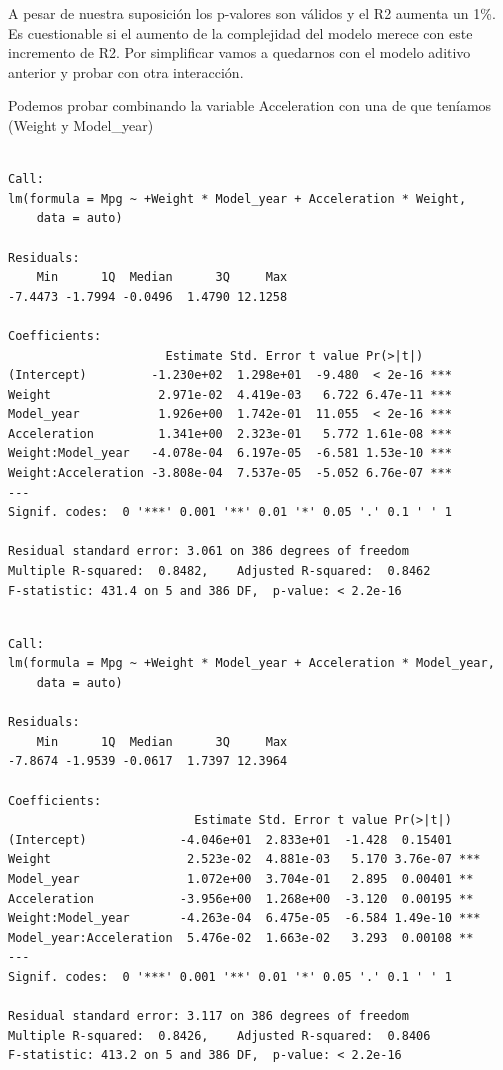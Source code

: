 A pesar de nuestra suposición los p-valores son válidos y el R2 aumenta un 1\%. Es cuestionable si el aumento de la complejidad del modelo merece con este incremento de R2. Por simplificar vamos a quedarnos con el modelo aditivo anterior y probar con otra interacción.

Podemos probar combinando la variable Acceleration con una de que teníamos (Weight y Model\_year)

\begin{verbatim}

Call:
lm(formula = Mpg ~ +Weight * Model_year + Acceleration * Weight, 
    data = auto)

Residuals:
    Min      1Q  Median      3Q     Max 
-7.4473 -1.7994 -0.0496  1.4790 12.1258 

Coefficients:
                      Estimate Std. Error t value Pr(>|t|)    
(Intercept)         -1.230e+02  1.298e+01  -9.480  < 2e-16 ***
Weight               2.971e-02  4.419e-03   6.722 6.47e-11 ***
Model_year           1.926e+00  1.742e-01  11.055  < 2e-16 ***
Acceleration         1.341e+00  2.323e-01   5.772 1.61e-08 ***
Weight:Model_year   -4.078e-04  6.197e-05  -6.581 1.53e-10 ***
Weight:Acceleration -3.808e-04  7.537e-05  -5.052 6.76e-07 ***
---
Signif. codes:  0 '***' 0.001 '**' 0.01 '*' 0.05 '.' 0.1 ' ' 1

Residual standard error: 3.061 on 386 degrees of freedom
Multiple R-squared:  0.8482,    Adjusted R-squared:  0.8462 
F-statistic: 431.4 on 5 and 386 DF,  p-value: < 2.2e-16
\end{verbatim}

\begin{verbatim}

Call:
lm(formula = Mpg ~ +Weight * Model_year + Acceleration * Model_year, 
    data = auto)

Residuals:
    Min      1Q  Median      3Q     Max 
-7.8674 -1.9539 -0.0617  1.7397 12.3964 

Coefficients:
                          Estimate Std. Error t value Pr(>|t|)    
(Intercept)             -4.046e+01  2.833e+01  -1.428  0.15401    
Weight                   2.523e-02  4.881e-03   5.170 3.76e-07 ***
Model_year               1.072e+00  3.704e-01   2.895  0.00401 ** 
Acceleration            -3.956e+00  1.268e+00  -3.120  0.00195 ** 
Weight:Model_year       -4.263e-04  6.475e-05  -6.584 1.49e-10 ***
Model_year:Acceleration  5.476e-02  1.663e-02   3.293  0.00108 ** 
---
Signif. codes:  0 '***' 0.001 '**' 0.01 '*' 0.05 '.' 0.1 ' ' 1

Residual standard error: 3.117 on 386 degrees of freedom
Multiple R-squared:  0.8426,    Adjusted R-squared:  0.8406 
F-statistic: 413.2 on 5 and 386 DF,  p-value: < 2.2e-16
\end{verbatim}

